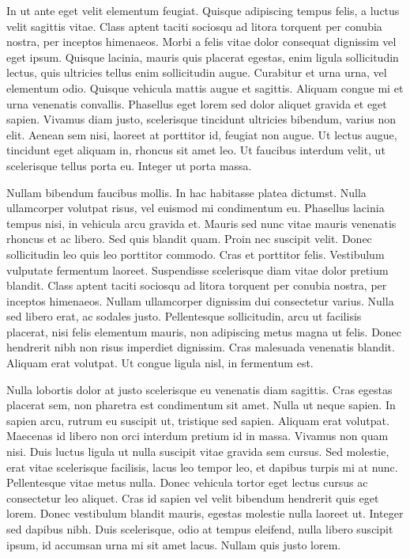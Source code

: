 In ut ante eget velit elementum feugiat. Quisque adipiscing tempus felis, a luctus velit sagittis vitae. Class aptent taciti sociosqu ad litora torquent per conubia nostra, per inceptos himenaeos. Morbi a felis vitae dolor consequat dignissim vel eget ipsum. Quisque lacinia, mauris quis placerat egestas, enim ligula sollicitudin lectus, quis ultricies tellus enim sollicitudin augue. Curabitur et urna urna, vel elementum odio. Quisque vehicula mattis augue et sagittis. Aliquam congue mi et urna venenatis convallis. Phasellus eget lorem sed dolor aliquet gravida et eget sapien. Vivamus diam justo, scelerisque tincidunt ultricies bibendum, varius non elit. Aenean sem nisi, laoreet at porttitor id, feugiat non augue. Ut lectus augue, tincidunt eget aliquam in, rhoncus sit amet leo. Ut faucibus interdum velit, ut scelerisque tellus porta eu. Integer ut porta massa.

Nullam bibendum faucibus mollis. In hac habitasse platea dictumst. Nulla ullamcorper volutpat risus, vel euismod mi condimentum eu. Phasellus lacinia tempus nisi, in vehicula arcu gravida et. Mauris sed nunc vitae mauris venenatis rhoncus et ac libero. Sed quis blandit quam. Proin nec suscipit velit. Donec sollicitudin leo quis leo porttitor commodo. Cras et porttitor felis. Vestibulum vulputate fermentum laoreet. Suspendisse scelerisque diam vitae dolor pretium blandit. Class aptent taciti sociosqu ad litora torquent per conubia nostra, per inceptos himenaeos. Nullam ullamcorper dignissim dui consectetur varius. Nulla sed libero erat, ac sodales justo. Pellentesque sollicitudin, arcu ut facilisis placerat, nisi felis elementum mauris, non adipiscing metus magna ut felis. Donec hendrerit nibh non risus imperdiet dignissim. Cras malesuada venenatis blandit. Aliquam erat volutpat. Ut congue ligula nisl, in fermentum est.

Nulla lobortis dolor at justo scelerisque eu venenatis diam sagittis. Cras egestas placerat sem, non pharetra est condimentum sit amet. Nulla ut neque sapien. In sapien arcu, rutrum eu suscipit ut, tristique sed sapien. Aliquam erat volutpat. Maecenas id libero non orci interdum pretium id in massa. Vivamus non quam nisi. Duis luctus ligula ut nulla suscipit vitae gravida sem cursus. Sed molestie, erat vitae scelerisque facilisis, lacus leo tempor leo, et dapibus turpis mi at nunc. Pellentesque vitae metus nulla. Donec vehicula tortor eget lectus cursus ac consectetur leo aliquet. Cras id sapien vel velit bibendum hendrerit quis eget lorem. Donec vestibulum blandit mauris, egestas molestie nulla laoreet ut. Integer sed dapibus nibh. Duis scelerisque, odio at tempus eleifend, nulla libero suscipit ipsum, id accumsan urna mi sit amet lacus. Nullam quis justo lorem.

